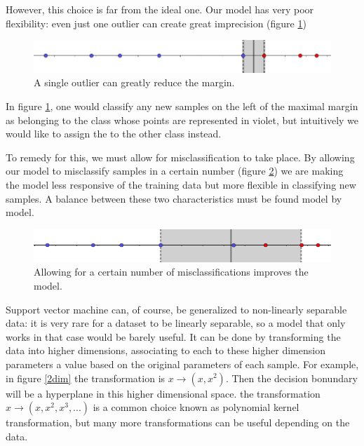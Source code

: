 \documentclass[a4paper]{report}
\begin{document}
However, this choice is far from the ideal one. Our model has very poor flexibility: even just one outlier can create great imprecision (figure \ref{1dim_disq2})


\begin{figure} [H]
    \centering
    \includegraphics [width=\textwidth ]{svm/1dim_disq2.png}
    \caption{A single outlier can greatly reduce the margin.}
    \label{1dim_disq2}
\end{figure}

In figure \ref{1dim_disq2}, one would classify any new samples on the left of the maximal margin as belonging to the class whose points are represented in violet, but intuitively we would like to assign the to the other class instead.

To remedy for this, we must allow for misclassification to take place. By allowing our model to misclassify samples in a certain number (figure \ref{1dim_alw}) we are making the model less responsive of the training data but more flexible in classifying new samples. A balance between these two characteristics must be found model by model.

\begin{figure} [H]
    \centering
    \includegraphics [width=\textwidth ]{svm/1dim_alw.png}
    \caption{Allowing for a certain number of  misclassifications improves the model.}
    \label{1dim_alw}
\end{figure}

Support vector machine can, of course, be generalized to non-linearly separable data: it is very rare for a dataset to be linearly separable, so a model that only works in that case would be barely useful. It can be done by transforming the data into higher dimensions, associating to each to these higher dimension parameters a value based on the original parameters of each sample. For example, in figure \ref{2dim} the transformation is $x \xrightarrow{}(x,x^2)$. Then the decision bonundary will be a hyperplane in this higher dimensional space. the transformation $x \xrightarrow{} (x, x^2, x^3, ...)$ is a common choice known as polynomial kernel transformation, but many more transformations can be useful depending on the data.
\end{document}
